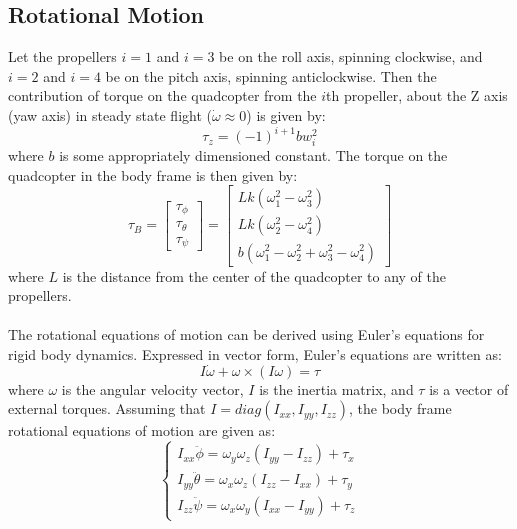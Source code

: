 \documentclass{article}
\begin{document}
\subsection{Rotational Motion}
Let the propellers $i=1$ and $i=3$ be on the roll axis, spinning clockwise, and $i=2$ and $i=4$ be on the pitch axis, spinning anticlockwise. Then the contribution of torque on the quadcopter from the $i$th propeller, about the Z axis (yaw axis) in steady state flight ($\dot{\omega}\approx0$) is given by:
\begin{equation}
\tau_z = (-1)^{i+1}bw_i^2
\end{equation}
where $b$ is some appropriately dimensioned constant. The torque on the quadcopter in the body frame is then given by:
\begin{equation}
\label{torque}
\tau_B 	= \begin{bmatrix} \tau_{\phi} \\ \tau_{\theta} \\ \tau_{\psi} \end{bmatrix}
		= \begin{bmatrix} Lk(\omega_1^2 - \omega_3^2) \\ Lk(\omega_2^2-\omega_4^2) \\ b(\omega_1^2-\omega_2^2+\omega_3^2-				\omega_4^2) \end{bmatrix}
\end{equation}
where $L$ is the distance from the center of the quadcopter to any of the propellers. \\\\
The rotational equations of motion can be derived using Euler's equations for rigid body dynamics. Expressed in vector form, Euler's equations are written as:
\begin{equation}
I\dot{\omega}+\omega\times(I\omega) = \tau
\end{equation}
where $\omega$ is the angular velocity vector, $I$ is the inertia matrix, and $\tau$ is a vector of external torques. Assuming that $I = diag(I_{xx}, I_{yy}, I_{zz})$, the body frame rotational equations of motion are given as:
\begin{equation}
\label{rotation}
\left\{
\begin{array}{rl}
I_{xx}\ddot{\phi}=\omega_y\omega_z(I_{yy}-I_{zz})+\tau_x\\
I_{yy}\ddot{\theta}=\omega_x\omega_z(I_{zz}-I_{xx})+\tau_y\\
I_{zz}\ddot{\psi}=\omega_x\omega_y(I_{xx}-I_{yy})+\tau_z
\end{array}
\right.
\end{equation} 
\end{document}

